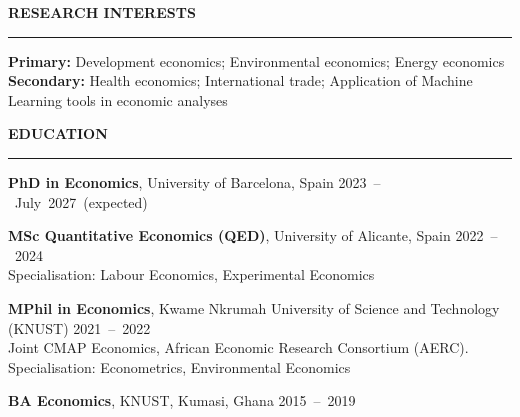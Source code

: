 \documentclass{resume} %
\def\sectionskip{\vspace{4pt}}
\def\sectionlineskip{\smallskip}
\renewenvironment{rSection}[1]{%
  \sectionskip
  \MakeUppercase{{\bf #1}}%
  \sectionlineskip
  \hrule
  \begin{list}{}{\setlength{\leftmargin}{0em}\setlength{\topsep}{5pt}\setlength{\itemsep}{0pt}\setlength{\parsep}{0pt}}%
  \item[]
}{%
  \end{list}
}
\newcommand{\when}[1]{\hfill\mbox{#1}}
\begin{document}
\begin{rSection}{Research Interests}
\textbf{Primary:} Development economics; Environmental economics; Energy economics\\
\textbf{Secondary:} Health economics; International trade; Application of Machine Learning tools in economic analyses
\end{rSection}


\begin{rSection}{Education}
\textbf{PhD in Economics}, University of Barcelona, Spain \when{2023 -- July 2027 (expected)}

\textbf{MSc Quantitative Economics (QED)}, University of Alicante, Spain \when{2022 -- 2024}\\
{\small Specialisation: Labour Economics, Experimental Economics}

\textbf{MPhil in Economics}, Kwame Nkrumah University of Science and Technology (KNUST) \when{2021 -- 2022}\\
{\small Joint CMAP Economics, African Economic Research Consortium (AERC). \\ Specialisation: Econometrics, Environmental Economics}

\textbf{BA Economics}, KNUST, Kumasi, Ghana \when{2015 -- 2019}
\end{rSection}
\end{document}
